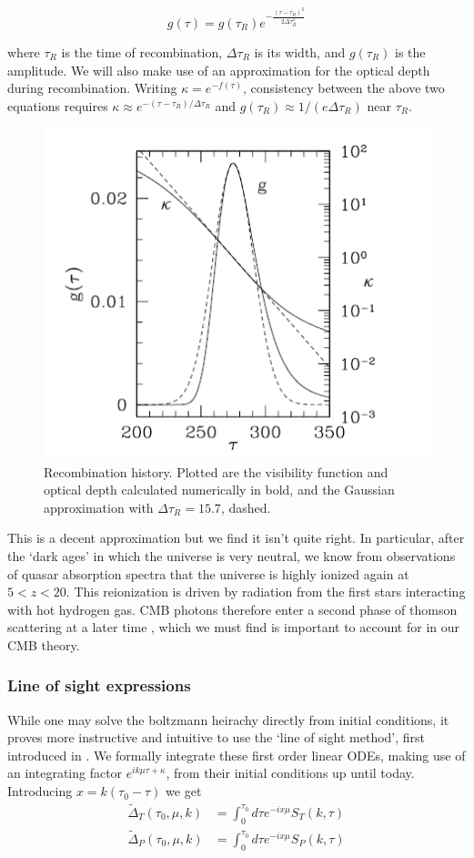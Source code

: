 \documentclass[a4paper,10pt]{article}
\begin{document}
\begin{equation}
g(\tau) = g(\tau_R)e^{-\frac{(\tau-\tau_R)^2}{2\Delta\tau_R^2}}
\end{equation}

where $\tau_R$ is the time of recombination, $\Delta\tau_R$ is its width, and $g(\tau_R)$ is the amplitude. We will also make use of an approximation for the optical depth during recombination. Writing $\kappa = e^{-f(\tau)}$, consistency between the above two equations requires $\kappa \approx e^{-(\tau-\tau_R) / \Delta\tau_R}$ and $g(\tau_R)\approx 1/(e\Delta\tau_R)$ near $\tau_R$. 

\begin{figure}[h]
  \includegraphics[width=0.5\linewidth]{recombinationhistory.png}
  \centering
  \caption{Recombination history. Plotted are the visibility function and optical depth calculated numerically in bold, and the Gaussian approximation with $\Delta\tau_R=15.7$, dashed. }
\end{figure}

This is a decent approximation but we find it isn't quite right. In particular, after the `dark ages' in which the universe is very neutral, we know from observations of quasar absorption spectra that the universe is highly ionized again at $5<z<20$. This reionization is driven by radiation from the first stars interacting with hot hydrogen gas. CMB photons therefore enter a second phase of thomson scattering at a later time \cite{reionisation}, which we must find is important to account for in our CMB theory.

\subsubsection{Line of sight expressions}

While one may solve the boltzmann heirachy directly from initial conditions, it proves more instructive and intuitive to use the `line of sight method', first introduced in \citep{LoS}. We formally integrate these first order linear ODEs, making use of an integrating factor $e^{ik\mu\tau+\kappa}$, from their initial conditions up until today.  Introducing $x=k(\tau_0-\tau)$ we get  
\begin{equation}\begin{split}
\tilde{\Delta}_T(\tau_0,\mu,k) &= \int_0^{\tau_0}d\tau e^{-ix\mu}S_T(k,\tau)\\
\tilde{\Delta}_P(\tau_0,\mu,k) &= \int_0^{\tau_0}d\tau e^{-ix\mu}S_P(k,\tau)
\end{split}\end{equation}
\end{document}
